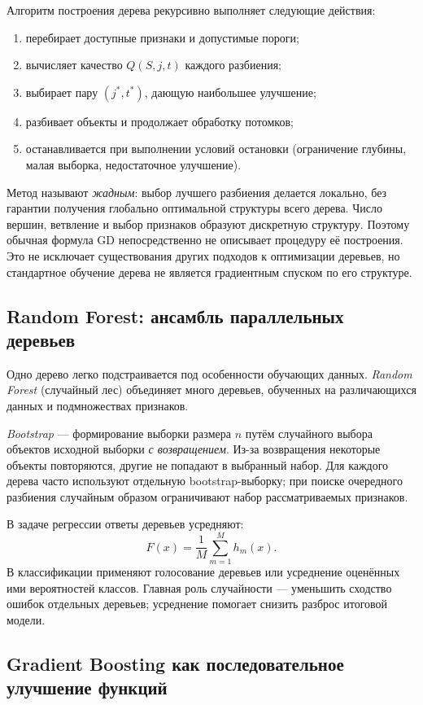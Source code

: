 \documentclass[12pt,a4paper]{article}
\begin{document}
Алгоритм построения дерева рекурсивно выполняет следующие действия:
\begin{enumerate}[label=\arabic*)]
    \item перебирает доступные признаки и допустимые пороги;
    \item вычисляет качество $Q(S,j,t)$ каждого разбиения;
    \item выбирает пару $(j^*,t^*)$, дающую наибольшее улучшение;
    \item разбивает объекты и продолжает обработку потомков;
    \item останавливается при выполнении условий остановки
    (ограничение глубины, малая выборка, недостаточное улучшение).
\end{enumerate}

Метод называют \emph{жадным}: выбор лучшего разбиения
делается локально, без гарантии получения глобально
оптимальной структуры всего дерева.
Число вершин, ветвление и выбор признаков образуют
дискретную структуру. Поэтому обычная формула GD
непосредственно не описывает процедуру её построения.
Это не исключает существования других подходов к оптимизации
деревьев, но стандартное обучение дерева не является
градиентным спуском по его структуре.

\subsection{Random Forest: ансамбль параллельных деревьев}

Одно дерево легко подстраивается под особенности обучающих данных.
\emph{Random Forest} (случайный лес) объединяет много деревьев,
обученных на различающихся данных и подмножествах признаков.

\emph{Bootstrap} --- формирование выборки размера $n$ путём
случайного выбора объектов исходной выборки \emph{с возвращением}.
Из-за возвращения некоторые объекты повторяются, другие не попадают
в выбранный набор. Для каждого дерева часто используют отдельную
bootstrap-выборку; при поиске очередного разбиения случайным образом
ограничивают набор рассматриваемых признаков.

В задаче регрессии ответы деревьев усредняют:
\[
    F(x)=\frac1M\sum_{m=1}^{M}h_m(x).
\]
В классификации применяют голосование деревьев или
усреднение оценённых ими вероятностей классов.
Главная роль случайности --- уменьшить сходство ошибок отдельных
деревьев; усреднение помогает снизить разброс итоговой модели.

\subsection{Gradient Boosting как последовательное улучшение функций}
\end{document}
